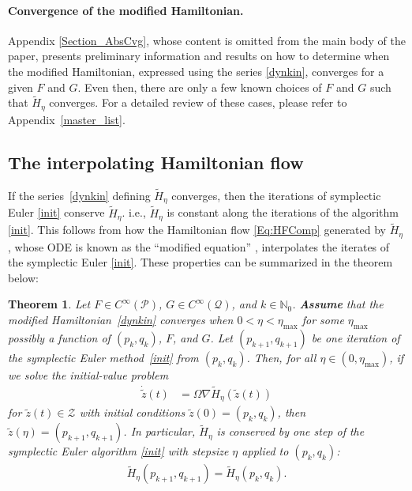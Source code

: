 \documentclass[11pt]{article}
\newtheorem{theorem}{Theorem}
\renewcommand{\P}{\mathcal{P}}
\newcommand{\Z}{\mathcal{Z}}
\newcommand{\N}{\mathbb{N}}
\newcommand{\Q}{\mathcal{Q}}
\begin{document}
\paragraph{Convergence of the modified Hamiltonian.} Appendix \ref{Section_AbsCvg}, whose content is omitted from the main body of the paper, presents preliminary information and results on how to determine when the modified Hamiltonian, expressed using the series \eqref{dynkin}, converges for a given $F$ and $G$. Even then, there are only a few known choices of $F$ and $G$ such that $\widetilde{H}_{\eta}$ converges. For a detailed review of these cases, please refer to Appendix~\ref{master_list}.

\subsection{The interpolating Hamiltonian flow}\label{interpolant}

If the series~\eqref{dynkin} defining $\tilde H_\eta$ converges, then the iterations of symplectic Euler \eqref{init} conserve $\widetilde{H}_{\eta}$. i.e., $\widetilde{H}_{\eta}$ is constant along the iterations of the algorithm \eqref{init}. This follows from how the Hamiltonian flow \eqref{Eq:HFComp} generated by $\widetilde{H}_{\eta}$, whose ODE is known as the ``modified equation'' \citep{Skeel,Hairer2006}, interpolates the iterates of the symplectic Euler \eqref{init}. These properties can be summarized in the theorem below:

\begin{theorem}\label{conserved_Hamiltonian}
    Let $F\in C^{\infty}\left(\P\right)$, $G\in C^{\infty}\left(\Q\right)$, and $k\in\N_{0}$. {\bf Assume} that the modified Hamiltonian~\eqref{dynkin} converges when $0 < \eta < \eta_{\max}$ for some $\eta_{\max}$ possibly a function of $\left(p_{k},q_{k}\right)$, $F$, and $G$. Let $(p_{k+1}, q_{k+1})$ be one iteration of the symplectic Euler method~\eqref{init} from $(p_k, q_k)$. Then, for all $\eta\in\left(0,\eta_{\max}\right)$, if we solve the initial-value problem
    \begin{align}
    \dot{\widetilde{z}}(t) &=\Omega\nabla\widetilde{H}_{\eta}\left(\widetilde{z}\left(t\right)\right)\nonumber
\end{align}
for $\widetilde{z}(t)\in\Z$ with initial conditions $\widetilde{z}\left(0\right)=\left(p_{k},q_{k}\right)$, then $\widetilde{z}\left(\eta\right)=\left(p_{k+1},q_{k+1}\right)$. In particular, $\widetilde{H}_{\eta}$ is conserved by one step of the symplectic Euler algorithm \eqref{init} with stepsize $\eta$ applied to $\left(p_{k},q_{k}\right)$:
    \begin{gather}
        \widetilde{H}_{\eta}\left(p_{k+1},q_{k+1}\right)=\widetilde{H}_{\eta}\left(p_{k},q_{k}\right).\nonumber
    \end{gather}
\end{theorem}
\end{document}
